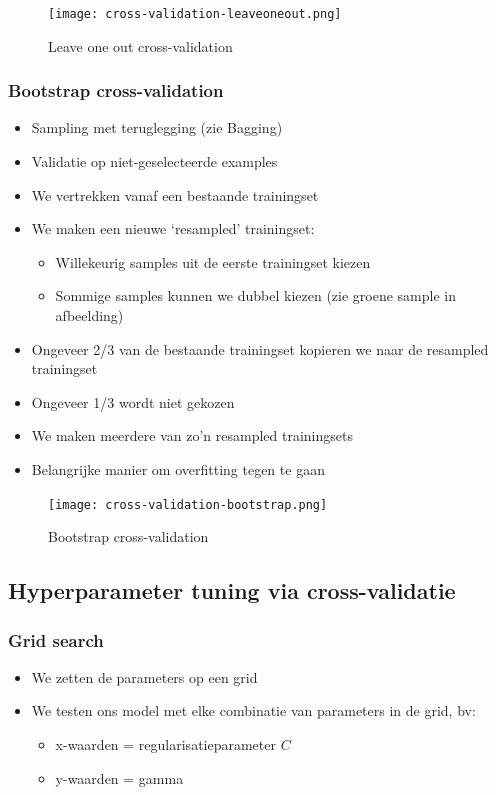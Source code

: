 \documentclass{article}
\begin{document}
\begin{figure}[H]
    \centering
    \texttt{[image: cross-validation-leaveoneout.png]}
    \caption{Leave one out cross-validation}
\end{figure}

\subsubsection{Bootstrap cross-validation}

\begin{itemize}
    \item Sampling met teruglegging (zie Bagging)
    \item Validatie op niet-geselecteerde examples
    \item We vertrekken vanaf een bestaande trainingset
    \item We maken een nieuwe `resampled' trainingset:
    \begin{itemize}
        \item Willekeurig samples uit de eerste trainingset kiezen
        \item Sommige samples kunnen we dubbel kiezen (zie groene sample in afbeelding)
    \end{itemize}
    \item Ongeveer 2/3 van de bestaande trainingset kopieren we naar de resampled trainingset
    \item Ongeveer 1/3 wordt niet gekozen
    \item We maken meerdere van zo'n resampled trainingsets
    \item Belangrijke manier om overfitting tegen te gaan
\end{itemize}

\begin{figure}[H]
    \centering
    \texttt{[image: cross-validation-bootstrap.png]}
    \caption{Bootstrap cross-validation}
\end{figure}

\subsection{Hyperparameter tuning via cross-validatie}

\subsubsection{Grid search}

\begin{itemize}
    \item We zetten de parameters op een grid
    \item We testen ons model met elke combinatie van parameters in de grid, bv:
    \begin{itemize}
        \item x-waarden = regularisatieparameter $C$
        \item y-waarden = gamma
    \end{itemize}
\end{itemize}
\end{document}
